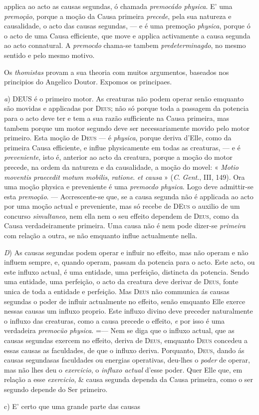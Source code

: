 applica ao acto as causas segundas, ó chamada \emph{premocádo physica}. E' uma \emph{premoção}, porque a moção da Causa primeira \emph{precede}, pela sua natureza e causalidade, o acto das causas segundas, --- e é uma premoção \emph{physica}, porque ó o acto de uma Causa efficiente, que move e applica activamente a causa segunda ao acto connatural. A \emph{premocdo} chama-se tambem \emph{predeterminagdo}, no mesmo sentido e pelo mesmo motivo.\par Os \emph{thomistas} provam a sua theoria com muitos argumentos, baseados nos principios do Angelico Doutor. Expomos os principaes.\par \emph{a}) \textsc{DEUS} é o primeiro motor. As creaturas não podem operar senão emquanto são movidas e applicadas por \textsc{Deus}; não só porque toda a passagem da potencia para o acto deve ter e tem a sua razão sufficiente na Causa primeira, mas tambem porque um motor segundo deve ser necessariamente movido pelo motor primeiro. Esta moção de \textsc{Deus} --- é \emph{physica}, porque deriva d'Elle, como da primeira Causa efficiente, e influe physicamente em todas as creaturas, --- e é \emph{preveniente}, isto é, anterior ao acto da creatura, porque a moção do motor precede, na ordem da natureza e da causalidade, a moção do movel: « \emph{Motio moventis praecedit motum mobilis}, \emph{ratione}. \emph{et causa} » (\emph{C}. \emph{Gent}., III, 149). Ora uma moção physica e preveniente é uma \emph{premocdo physica}. Logo deve admittir-se esta \emph{premoção}. --- Accrescente-se que, se a causa segunda não é applicada ao acto por uma moção actual e preveniente, mas só recebe de \textsc{DEus} o auxilio de um concurso \emph{simultaneo}, nem ella nem o seu effeito dependem de \textsc{Deus}, como da Causa verdadeiramente primeira. Uma causa não é nem pode dizer-se \emph{primeira} com relação a outra, se não emquanto influe actualmente nella.\par \emph{D}) As causas segundas podem operar e influir no effeito, mas não operam e não influem sempre, e, quando operam, passam da potencia para o acto. Este acto, ou este influxo actual, é uma entidade, uma perfeição, distincta da potencia. Sendo uma entidade, uma perfeição, o acto da creatura deve derivar de \textsc{Deus}, fonte unica de toda a entidade e perfeição. Mas \textsc{Deus} não communica ás causas segundas o poder de influir actualmente no effeito, senão emquanto Elle exerce nessas causas um influxo proprio. Este influxo divino deve preceder naturalmente o influxo das creaturas, como a causa precede o effeito, \emph{e} por isso é uma verdadeira \emph{premocüo physica}. =--- Nem se diga que o influxo actual, que as causas segundas exercem no effeito, deriva de \textsc{Deus}, emquanto \textsc{Deus} concedeu a essas causas as faculdades, de que o influxo deriva. Porquanto, \textsc{Deus}, dando ás causas segundasas faculdades ou energias operativas, deu-lhes o \emph{poder} de operar, mas não lhes deu o \emph{exercicio}, o \emph{influxo actual} d'esse poder. Quer Elle que, em relação a esse \emph{exercicio}, \& causa segunda dependa da Causa primeira, como o ser segundo depende do Ser primeiro.\par c) E' certo que uma grande parte das causas 